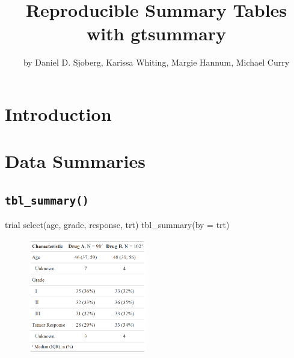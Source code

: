 \title{Reproducible Summary Tables with gtsummary}
\author{by Daniel D. Sjoberg, Karissa Whiting, Margie Hannum, Michael Curry}

\maketitle


\section{Introduction}

\section{Data Summaries}




\subsection{\texorpdfstring{\texttt{tbl\_summary()}}{tbl\_summary()}}

\begin{example}
trial %
  select(age, grade, response, trt) %
  tbl_summary(by = trt)
\end{example}
\begin{figure}[h!]
  \includegraphics[height=5cm]{summary_basic.png}
  \centering
\end{figure}


